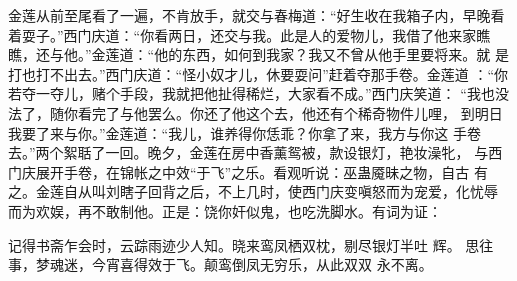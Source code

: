 金莲从前至尾看了一遍，不肯放手，就交与春梅道：“好生收在我箱子内，早晚看
着耍子。”西门庆道：“你看两日，还交与我。此是人的爱物儿，我借了他来家瞧
瞧，还与他。”金莲道：“他的东西，如何到我家？我又不曾从他手里要将来。就
是打也打不出去。”西门庆道：“怪小奴才儿，休要耍问”赶着夺那手卷。金莲道
：“你若夺一夺儿，赌个手段，我就把他扯得稀烂，大家看不成。”西门庆笑道：
“我也没法了，随你看完了与他罢么。你还了他这个去，他还有个稀奇物件儿哩，
到明日我要了来与你。”金莲道：“我儿，谁养得你恁乖？你拿了来，我方与你这
手卷去。”两个絮聒了一回。晚夕，金莲在房中香薰鸳被，款设银灯，艳妆澡牝，
与西门庆展开手卷，在锦帐之中效“于飞”之乐。看观听说：巫蛊魇昧之物，自古
有之。金莲自从叫刘瞎子回背之后，不上几时，使西门庆变嗔怒而为宠爱，化忧辱
而为欢娱，再不敢制他。正是：饶你奸似鬼，也吃洗脚水。有词为证：

记得书斋乍会时，云踪雨迹少人知。晓来鸾凤栖双枕，剔尽银灯半吐
辉。  思往事，梦魂迷，今宵喜得效于飞。颠鸾倒凤无穷乐，从此双双
永不离。